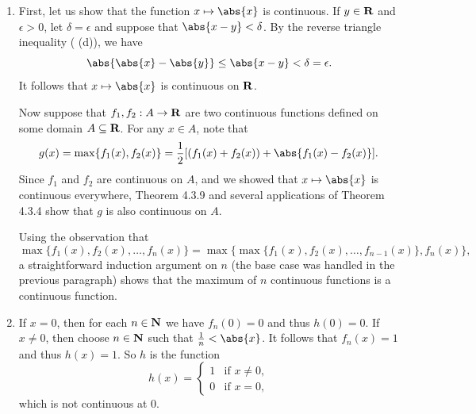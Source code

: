 \documentclass{lew98_solutions}
\begin{document}
\begin{solution}
    \begin{enumerate}
        \item First, let us show that the function \( x \mapsto \abs{x} \) is continuous. If \( y \in \mathbf{R} \) and \( \epsilon > 0 \), let \( \delta = \epsilon \) and suppose that \( \abs{x - y} < \delta \). By the reverse triangle inequality ( (d)), we have
        \[
            \abs{\abs{x} - \abs{y}} \leq \abs{x - y} < \delta = \epsilon.
        \]
        It follows that \( x \mapsto \abs{x} \) is continuous on \( \mathbf{R} \).
        
        Now suppose that \( f_1, f_2 : A \to \mathbf{R} \) are two continuous functions defined on some domain \( A \subseteq \mathbf{R} \). For any \( x \in A \), note that
        \[
            g(x) = \max \{ f_1(x), f_2(x) \} = \frac{1}{2}[(f_1(x) + f_2(x)) + \abs{f_1(x) - f_2(x)}].
        \]
        Since \( f_1 \) and \( f_2 \) are continuous on \( A \), and we showed that \( x \mapsto \abs{x} \) is continuous everywhere, Theorem 4.3.9 and several applications of Theorem 4.3.4 show that \( g \) is also continuous on \( A \).

        Using the observation that
        \[
            \max \{ f_1(x), f_2(x), \ldots, f_n(x) \} = \max \{ \max \{ f_1(x), f_2(x), \ldots, f_{n-1}(x) \}, f_n(x) \},
        \]
        a straightforward induction argument on \( n \) (the base case was handled in the previous paragraph) shows that the maximum of \( n \) continuous functions is a continuous function.

        \item If \( x = 0 \), then for each \( n \in \mathbf{N} \) we have \( f_n(0) = 0 \) and thus \( h(0) = 0 \). If \( x \neq 0 \), then choose \( n \in \mathbf{N} \) such that \( \tfrac{1}{n} < \abs{x} \). It follows that \( f_n(x) = 1 \) and thus \( h(x) = 1 \). So \( h \) is the function
        \[
            h(x) = \begin{cases}
                1 & \text{if } x \neq 0, \\
                0 & \text{if } x = 0,
            \end{cases}
        \]
        which is not continuous at 0.
    \end{enumerate}
\end{solution}
\end{document}
